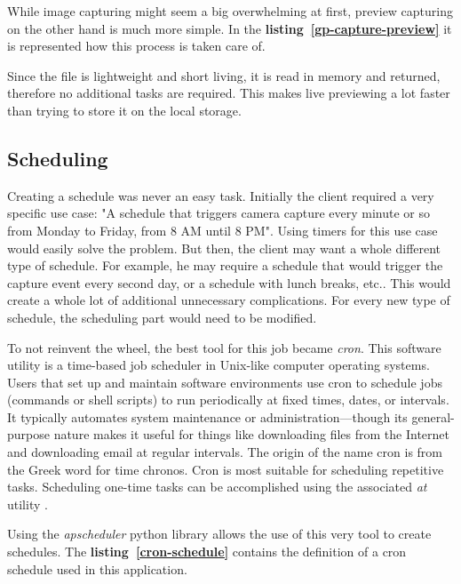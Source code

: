 \vspace{0.3cm}
While image capturing might seem a big overwhelming at first, preview capturing on the other hand is much more simple. In the \textbf{\mbox{listing \ref{gp-capture-preview}}} it is represented how this process is taken care of.



\vspace{0.3cm}
Since the file is lightweight and short living, it is read in memory and returned, therefore no additional tasks are required. This makes live previewing a lot faster than trying to store it on the local storage.

\vspace{0.3cm}
\subsection{Scheduling}

Creating a schedule was never an easy task. Initially the client required a very specific use case: "A schedule that triggers camera capture every minute or so from Monday to Friday, from 8 AM until 8 PM". Using timers for this use case would easily solve the problem. But then, the client may want a whole different type of schedule. For example, he may require a schedule that would trigger the capture event every second day, or a schedule with lunch breaks, etc.. This would create a whole lot of additional unnecessary complications. For every new type of schedule, the scheduling part would need to be modified.

To not reinvent the wheel, the best tool for this job became \textit{cron}. This software utility is a time-based job scheduler in Unix-like computer operating systems. Users that set up and maintain software environments use cron to schedule jobs (commands or shell scripts) to run periodically at fixed times, dates, or intervals. It typically automates system maintenance or administration—though its general-purpose nature makes it useful for things like downloading files from the Internet and downloading email at regular intervals. The origin of the name cron is from the Greek word for time chronos. Cron is most suitable for scheduling repetitive tasks. Scheduling one-time tasks can be accomplished using the associated \textit{at} utility \cite{cron}.

Using the \textit{apscheduler} python library allows the use of this very tool to create schedules. The \textbf{\mbox{listing \ref{cron-schedule}}} contains the definition of a cron schedule used in this application.

